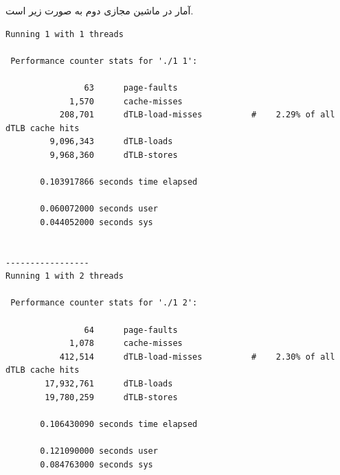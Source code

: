 \documentclass{article}
\begin{document}
آمار در ماشین مجازی دوم به صورت زیر است.
\begin{latin}
\begin{lstlisting}
Running 1 with 1 threads

 Performance counter stats for './1 1':

                63      page-faults                                                 
             1,570      cache-misses                                                
           208,701      dTLB-load-misses          #    2.29% of all dTLB cache hits 
         9,096,343      dTLB-loads                                                  
         9,968,360      dTLB-stores                                                 

       0.103917866 seconds time elapsed

       0.060072000 seconds user
       0.044052000 seconds sys


-----------------
Running 1 with 2 threads

 Performance counter stats for './1 2':

                64      page-faults                                                 
             1,078      cache-misses                                                
           412,514      dTLB-load-misses          #    2.30% of all dTLB cache hits 
        17,932,761      dTLB-loads                                                  
        19,780,259      dTLB-stores                                                 

       0.106430090 seconds time elapsed

       0.121090000 seconds user
       0.084763000 seconds sys
\end{lstlisting}
\end{latin}
\end{document}
